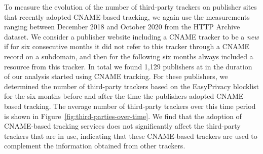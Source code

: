 To measure the evolution of the number of third-party trackers on publisher sites that recently adopted CNAME-based tracking, we again use the measurements ranging between December 2018 and October 2020 from the HTTP Archive dataset.
We consider a publisher website including a CNAME tracker to be a \emph{new} if for six consecutive months it did not refer to this tracker through a CNAME record on a subdomain, and then for the following six months always included a resource from this tracker.
In total we found 1,129 publishers at in the duration of our analysis started using CNAME tracking.
For these publishers, we determined the number of third-party trackers based on the EasyPrivacy blocklist for the six months before and after the time the publishers adopted CNAME-based tracking.
The average number of third-party trackers over this time period is shown in Figure~\ref{fig:third-parties-over-time}.
We find that the adoption of CNAME-based tracking services does not significantly affect the third-party trackers that are in use, indicating that these CNAME-based trackers are used to complement the information obtained from other trackers.
